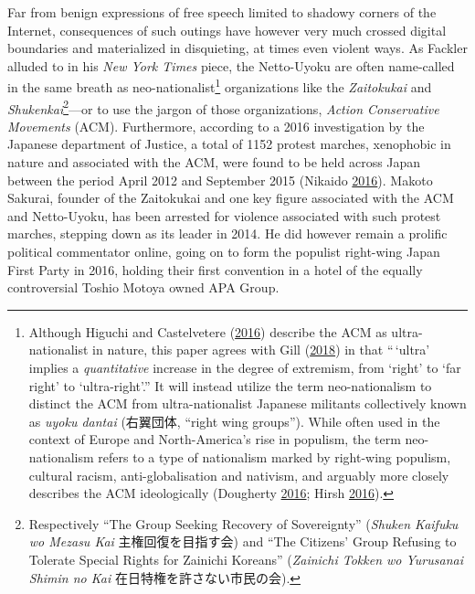 \documentclass[10pt,british,A4paper,,openany]{memoir}
\begin{document}
Far from benign expressions of free speech limited to shadowy corners of
the Internet, consequences of such outings have however very much
crossed digital boundaries and materialized in disquieting, at times
even violent ways. As Fackler alluded to in his \emph{New York Times}
piece, the Netto-Uyoku are often name-called in the same breath as
neo-nationalist\footnote{Although Higuchi and Castelvetere
  (\protect\hyperlink{ref-higuchi_japans_2016}{2016}) describe the ACM
  as ultra-nationalist in nature, this paper agrees with Gill
  (\protect\hyperlink{ref-gill_nativist_2018}{2018}) in that ``\,`ultra'
  implies a \emph{quantitative} increase in the degree of extremism,
  from `right' to `far right' to `ultra-right'.'' It will instead
  utilize the term neo-nationalism to distinct the ACM from
  ultra-nationalist Japanese militants collectively known as \emph{uyoku
  dantai} (右翼団体, ``right wing groups''). While often used in the
  context of Europe and North-America's rise in populism, the term
  neo-nationalism refers to a type of nationalism marked by right-wing
  populism, cultural racism, anti-globalisation and nativism, and
  arguably more closely describes the ACM ideologically (Dougherty
  \protect\hyperlink{ref-dougherty_new_2016}{2016}; Hirsh
  \protect\hyperlink{ref-hirsh_why_2016}{2016}).} organizations like the
\emph{Zaitokukai} and \emph{Shukenkai}\footnote{Respectively ``The Group
  Seeking Recovery of Sovereignty'' (\emph{Shuken Kaifuku wo Mezasu Kai}
  主権回復を目指す会) and ``The Citizens' Group Refusing to Tolerate
  Special Rights for Zainichi Koreans'' (\emph{Zainichi Tokken wo
  Yurusanai Shimin no Kai} 在日特権を許さない市民の会).}---or to use the
jargon of those organizations, \emph{Action Conservative Movements}
(ACM). Furthermore, according to a 2016 investigation by the Japanese
department of Justice, a total of 1152 protest marches, xenophobic in
nature and associated with the ACM, were found to be held across Japan
between the period April 2012 and September 2015 (Nikaido
\protect\hyperlink{ref-nikaido_eng:_2016}{2016}). Makoto Sakurai,
founder of the Zaitokukai and one key figure associated with the ACM and
Netto-Uyoku, has been arrested for violence associated with such protest
marches, stepping down as its leader in 2014. He did however remain a
prolific political commentator online, going on to form the populist
right-wing Japan First Party in 2016, holding their first convention in
a hotel of the equally controversial Toshio Motoya owned APA Group.
\end{document}
